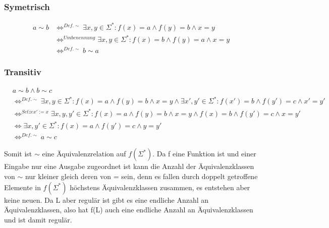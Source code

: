 \documentclass[12pt, a4paper]{article}
\begin{document}
\subsubsection*{Symetrisch}
\begin{align*}
a \sim b &\Longleftrightarrow^{Def. \sim} \exists x,y \in \Sigma^*:  f(x) = a \wedge f(y) = b \wedge x = y \\
&\Longleftrightarrow^{Umbenennung} \exists x,y \in \Sigma^*:  f(x) = b \wedge f(y) = a \wedge x = y \\
&\Longleftrightarrow^{Def. \sim} b \sim a
\end{align*}

\subsubsection*{Transitiv}
\begin{align*}
&a \sim b \wedge b \sim c \\
&\Longleftrightarrow^{Def. \sim} \exists x,y \in \Sigma^*:  f(x) = a \wedge f(y) = b \wedge x = y \wedge \exists x',y' \in \Sigma^*:  f(x') = b \wedge f(y') = c \wedge x' = y' \\ 
&\Longleftrightarrow^{Setze x' := x} \exists x,y,y' \in \Sigma^*:  f(x) = a \wedge f(y) = b \wedge x = y \wedge  f(x) = b \wedge f(y') = c \wedge x = y' \\ 
&\Longleftrightarrow \exists x,y' \in \Sigma^*:  f(x) = a  \wedge f(y') = c \wedge y = y' \\
&\Longleftrightarrow^{Def. \sim} a \sim c
\end{align*}

Somit ist $\sim$ eine Äquivalenzrelation auf $f(\Sigma^*)$. Da f eine Funktion ist und einer Eingabe nur eine Ausgabe zugeordnet ist kann die Anzahl der Äquivalenzklassen von $\sim$ nur kleiner gleich deren von = sein, denn es fallen durch doppelt getroffene Elemente in $f(\Sigma^*)$ höchstens Äquivalenzklassen zusammen, es entstehen aber keine neuen. Da L aber regulär ist gibt es eine endliche Anzahl an Äquivalenzklassen, also hat f(L) auch eine endliche Anzahl an Äquivalenzklassen und ist damit regulär.
\end{document}
